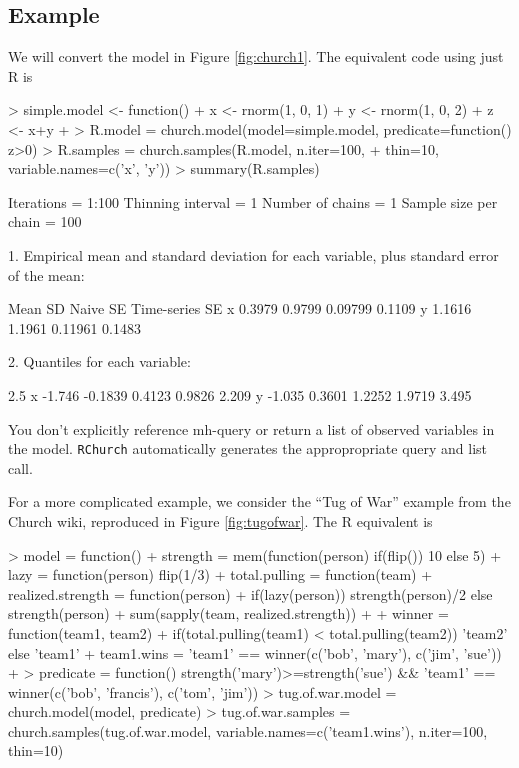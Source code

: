 \documentclass[12pt]{article}
\newcommand{\rchurch}{\texttt{RChurch}\xspace}
\begin{document}
\subsection{Example}
We will convert the model in Figure \ref{fig:church1}. The equivalent code using just R is

\begin{Schunk}
\begin{Sinput}
> simple.model <- function() {
+   x <- rnorm(1, 0, 1)
+   y <- rnorm(1, 0, 2)
+   z <- x+y
+ }
> R.model = church.model(model=simple.model, predicate=function() {z>0})
> R.samples = church.samples(R.model, n.iter=100, 
+   thin=10, variable.names=c('x', 'y'))
> summary(R.samples)
\end{Sinput}
\begin{Soutput}
Iterations = 1:100
Thinning interval = 1 
Number of chains = 1 
Sample size per chain = 100 

1. Empirical mean and standard deviation for each variable,
   plus standard error of the mean:

    Mean     SD Naive SE Time-series SE
x 0.3979 0.9799  0.09799         0.1109
y 1.1616 1.1961  0.11961         0.1483

2. Quantiles for each variable:

    2.5%     25%    50%    75% 97.5%
x -1.746 -0.1839 0.4123 0.9826 2.209
y -1.035  0.3601 1.2252 1.9719 3.495
\end{Soutput}
\end{Schunk}

You don't explicitly reference mh-query or return a list of observed variables in the model. \rchurch automatically generates the appropropriate query and list call. 


For a more complicated example, we consider the ``Tug of War'' example from the Church wiki, reproduced in Figure \ref{fig:tugofwar}. The R equivalent is

\begin{Schunk}
\begin{Sinput}
> model = function() {
+   strength = mem(function(person) if(flip()) 10 else 5)
+   lazy = function(person) flip(1/3)
+   total.pulling = function(team) {
+     realized.strength = function(person) 
+       if(lazy(person)) strength(person)/2 else strength(person)
+     sum(sapply(team, realized.strength))
+   }
+   winner = function(team1, team2) 
+     if(total.pulling(team1) < total.pulling(team2)) 'team2' else 'team1'
+   team1.wins = 'team1' == winner(c('bob', 'mary'), c('jim', 'sue'))
+ }
> predicate = function() {strength('mary')>=strength('sue') && 'team1' == winner(c('bob', 'francis'), c('tom', 'jim'))}
> tug.of.war.model = church.model(model, predicate)
> tug.of.war.samples = church.samples(tug.of.war.model, variable.names=c('team1.wins'), n.iter=100, thin=10)
\end{Sinput}
\end{Schunk}
\end{document}
